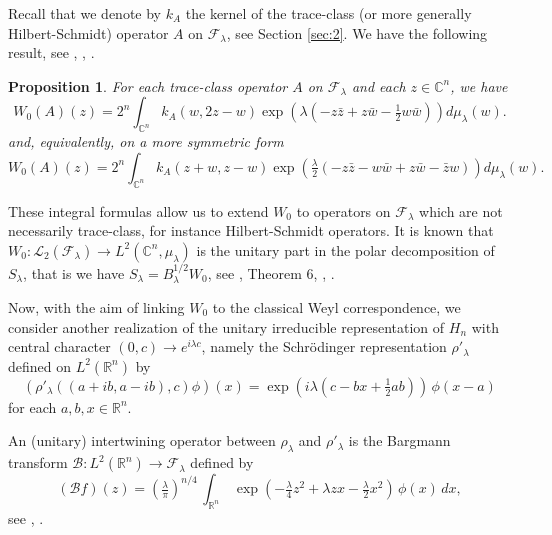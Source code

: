 \documentclass[12pt]{amsart}
\numberwithin{equation}{section}
\newtheorem{proposition}[theorem]{Proposition}
\begin{document}
Recall that we denote by $k_A$ the kernel  
of the trace-class (or more generally Hilbert-Schmidt) operator $A$ on 
${\mathcal F}_{\lambda}$, see Section \ref{sec:2}.
We have the following result, see \cite{CaTs}, \cite{CaTo}, \cite{AU1}.

\begin{proposition} \label{prop:intW} For each trace-class operator $A$ on ${\mathcal F}_{\lambda}$
and each $z \in {\mathbb C}^n$, we have
\begin{equation} \label{eq:intW}
W_0(A)(z)=2^n\int_{{\mathbb C}^n}k_A(w,2z-w)\exp \left({\lambda}\left(-z{\bar z}+z{\bar w}-\tfrac{1}{2}w{\bar w}\right)\right) d\mu_{\lambda}(w). 
\end{equation} and, equivalently, on a more symmetric form
\begin{equation} \label{eq:intWsym}
W_0(A)(z)=2^n\int_{{\mathbb C}^n}k_A(z+w,z-w)\exp \left(\tfrac{\lambda}{2}\left(-z{\bar z}-w{\bar w}+z{\bar w}-{\bar z}w\right)\right) d\mu_{\lambda}(w).\end{equation}
\end{proposition}

These integral formulas allow us to extend $W_0$ to operators
on ${\mathcal F}_{\lambda}$  which are not necessarily trace-class, for instance Hilbert-Schmidt operators.  It is known that $W_0:{\mathcal L}_2({\mathcal F}_{\lambda})\rightarrow L^2({\mathbb C}^n,\mu_{\lambda})$ is the unitary part in the polar decomposition of $S_{\lambda}$, that is we have $S_{\lambda}=B_{\lambda}^{1/2}W_0$, see  \cite{Luo}, Theorem 6, \cite{CaRiv}, \cite{CaTs}. 

Now, with the aim of linking $W_0$ to the classical Weyl correspondence, we consider
another realization of the unitary irreducible representation of $H_n$ with central character
$(0,c)\rightarrow e^{i\lambda c}$, namely the Schr\"odinger representation $\rho'_{\lambda}$
defined on $L^2({\mathbb R}^n)$ by
\begin{equation*}(\rho'_{\lambda}((a+ib,a-ib),c)\phi)(x)
=\exp \left(i\lambda (c-bx+\tfrac{1}{2}ab)\right)\,\phi(x-a) \end{equation*}
for each $a, b, x \in {\mathbb R}^n$.

An (unitary) intertwining operator between $\rho_{\lambda}$ and $\rho'_{\lambda}$ is the Bargmann
transform $\mathcal B: L^2({\mathbb R}^n)\rightarrow {\mathcal F}_{\lambda}$  defined by
\begin{equation*}({\mathcal B}f)(z)=\left(\tfrac{\lambda}{\pi}\right)^{n/4}\,\int_{{\mathbb R}^n}\,\exp
\left(-\tfrac{\lambda}{4}z^2+\lambda zx-\tfrac{\lambda}{2}x^2\right)
\,\phi(x)\,dx,\end{equation*} 
see \cite{Fo}, \cite{CaRiv}.
\end{document}
